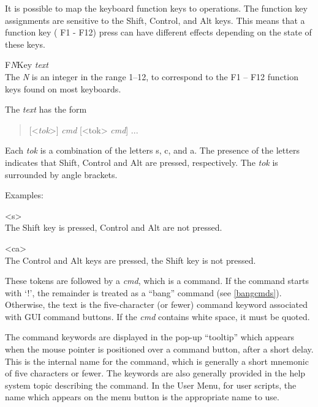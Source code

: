 It is possible to map the keyboard function keys to {\Xic} operations. 
The function key assignments are sensitive to the {\kb Shift}, {\kb
Control}, and {\kb Alt} keys.  This means that a function key ({\kb
F1} - {\kb F12}) press can have different effects depending on the
state of these keys.

\begin{description}
\item{\vt F{\it N\/}Key {\it text}}\\
The {\it N} is an integer in the range 1--12, to correspond to the
{\kb F1} -- {\kb F12} function keys found on most keyboards.

The {\it text} has the form
\begin{quote}
[{\vt <}{\it tok\/}{\vt >}] {\it cmd}
[{\vt <}{\vt tok\/}{\vt >} {\it cmd\/}] ...
\end{quote}

Each {\it tok} is a combination of the letters {\vt s}, {\vt c}, and
{\vt a}.  The presence of the letters indicates that {\kb Shift}, {\kb
Control} and {\kb Alt} are pressed, respectively.  The {\it tok} is
surrounded by angle brackets.

Examples:
\begin{description}
\item{\vt <s>}\\
The {\kb Shift} key is pressed, {\kb Control} and {\kb Alt} are not
pressed.
\item{\vt <ca>}\\
The {\kb Control} and {\kb Alt} keys are pressed, the {\kb Shift} key
is not pressed.
\end{description}

These tokens are followed by a {\it cmd}, which is a command.  If the
command starts with `{\vt !}', the remainder is treated as a ``bang''
command (see \ref{bangcmds}).  Otherwise, the text is the
five-character (or fewer) command keyword associated with GUI command
buttons.  If the {\it cmd} contains white space, it must be quoted.

The command keywords are displayed in the pop-up ``tooltip'' which
appears when the mouse pointer is positioned over a command button,
after a short delay.  This is the internal name for the command, which
is generally a short mnemonic of five characters or fewer.  The
keywords are also generally provided in the help system topic
describing the command.  In the {\cb User Menu}, for user scripts, the
name which appears on the menu button is the appropriate name to use.


\end{description}
